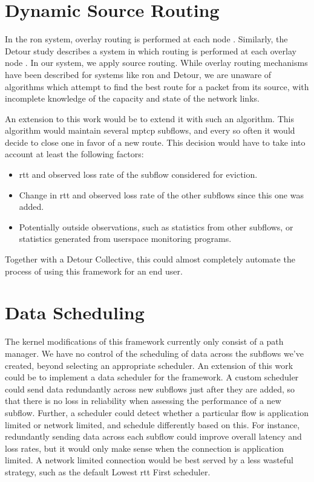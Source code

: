 \documentclass{cwru}
\begin{document}
\section{Dynamic Source Routing}

In the \ac{ron} system, overlay routing is performed at each node \cite{ron}.
Similarly, the Detour study describes a system in which routing is performed at
each overlay node \cite{detour}. In our system, we apply source routing. While
overlay routing mechanisms have been described for systems like \ac{ron} and
Detour, we are unaware of algorithms which attempt to find the best route for a
packet from its source, with incomplete knowledge of the capacity and state of
the network links.

An extension to this work would be to extend it with such an algorithm. This
algorithm would maintain several \ac{mptcp} subflows, and every so often it
would decide to close one in favor of a new route. This decision would have to
take into account at least the following factors:

\begin{itemize}
\item \ac{rtt} and observed loss rate of the subflow considered for eviction.
\item Change in \ac{rtt} and observed loss rate of the other subflows since this
  one was added.
\item Potentially outside observations, such as statistics from other subflows,
  or statistics generated from userspace monitoring programs.
\end{itemize}

Together with a Detour Collective, this could almost completely automate the
process of using this framework for an end user.

\section{Data Scheduling}

The kernel modifications of this framework currently only consist of a path
manager. We have no control of the scheduling of data across the subflows we've
created, beyond selecting an appropriate scheduler. An extension of this work
could be to implement a data scheduler for the framework. A custom scheduler
could send data redundantly across new subflows just after they are added, so
that there is no loss in reliability when assessing the performance of a new
subflow. Further, a scheduler could detect whether a particular flow is
application limited or network limited, and schedule differently based on this.
For instance, redundantly sending data across each subflow could improve overall
latency and loss rates, but it would only make sense when the connection is
application limited. A network limited connection would be best served by a less
wasteful strategy, such as the default Lowest \ac{rtt} First scheduler.
\end{document}
